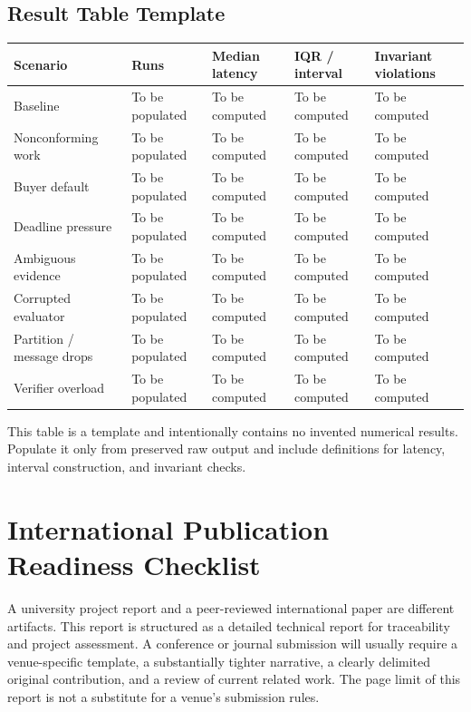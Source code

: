 \documentclass[12pt,a4paper,oneside]{report}
\renewcommand{\arraystretch}{1.2}
\begin{document}
\section{Result Table Template}
\footnotesize
\renewcommand{\arraystretch}{1.05}
\begin{longtable}{>{\raggedright\arraybackslash}p{}>{\raggedright\arraybackslash}p{}>{\raggedright\arraybackslash}p{}>{\raggedright\arraybackslash}p{}>{\raggedright\arraybackslash}p{}}
\toprule
Scenario & Runs & Median latency & IQR / interval & Invariant violations \\
\midrule
Baseline & To be populated & To be computed & To be computed & To be computed \\
Nonconforming work & To be populated & To be computed & To be computed & To be computed \\
Buyer default & To be populated & To be computed & To be computed & To be computed \\
Deadline pressure & To be populated & To be computed & To be computed & To be computed \\
Ambiguous evidence & To be populated & To be computed & To be computed & To be computed \\
Corrupted evaluator & To be populated & To be computed & To be computed & To be computed \\
Partition / message drops & To be populated & To be computed & To be computed & To be computed \\
Verifier overload & To be populated & To be computed & To be computed & To be computed \\
\bottomrule
\end{longtable}
\normalsize
\renewcommand{\arraystretch}{1.2}
This table is a template and intentionally contains no invented numerical results. Populate it only from preserved raw output and include definitions for latency, interval construction, and invariant checks.

\chapter{International Publication Readiness Checklist}
A university project report and a peer-reviewed international paper are different artifacts. This report is structured as a detailed technical report for traceability and project assessment. A conference or journal submission will usually require a venue-specific template, a substantially tighter narrative, a clearly delimited original contribution, and a review of current related work. The page limit of this report is not a substitute for a venue's submission rules.
\end{document}
